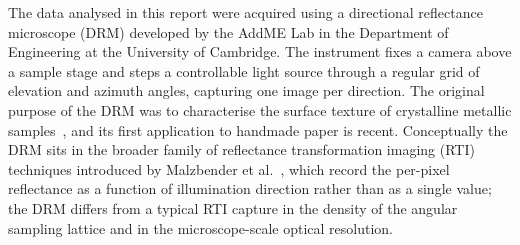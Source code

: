 The data analysed in this report were acquired using a directional
reflectance microscope (DRM) developed by the AddME Lab in the
Department of Engineering at the University of Cambridge. The
instrument fixes a camera above a sample stage and steps a
controllable light source through a regular grid of elevation and
azimuth angles, capturing one image per direction. The original
purpose of the DRM was to characterise the surface texture of
crystalline metallic samples~\cite{gaskey2020opticalchar,
wittwer2021drm}, and its first application to handmade paper is
recent. Conceptually the DRM sits in the broader family of
reflectance transformation imaging (RTI) techniques introduced by
Malzbender et al.~\cite{malzbender2001ptm}, which record the
per-pixel reflectance as a function of illumination direction
rather than as a single value; the DRM differs from a
typical RTI capture in the density of the angular sampling lattice
and in the microscope-scale optical resolution.

